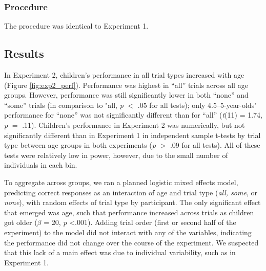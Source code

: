 \documentclass[man]{apa2}
\begin{document}
\subsubsection{Procedure}
The procedure was identical to Experiment 1.

\subsection{Results}

In Experiment 2, children's performance in all trial types increased with age (Figure \ref{fig:exp2_perf}). Performance was highest in ``all'' trials across all age groups. However, performance was still significantly lower in both ``none'' and ``some'' trials (in comparison to "all, \emph{p} $<$ .05 for all tests); only 4.5--5-year-olds' performance for ``none'' was not significantly different than for ``all'' (\emph{t}(11) = 1.74, \emph{p} $=$ .11). Children's performance in Experiment 2 was numerically, but not significantly different than in Experiment 1 in independent sample t-tests by trial type between age groups in both experiments (\emph{p} $>$ .09 for all tests). All of these tests were relatively low in power, however, due to the small number of individuals in each bin.



To aggregate across groups, we ran a planned logistic mixed effects model, predicting correct responses as an interaction of age and trial type (\textit{all, some}, or \textit{none}), with random effects of trial type by participant. The only significant effect that emerged was age, such that performance increased across trials as children got older ($\beta$ = 20, \textit{p} \textless  .001). Adding trial order (first or second half of the experiment) to the model did not interact with any of the variables, indicating the performance did not change over the course of the experiment. We suspected that this lack of a main effect was due to individual variability, such as in Experiment 1.
\end{document}
